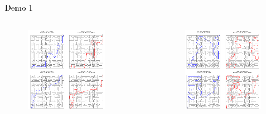 \documentclass[aspectratio=169]{beamer}
\begin{document}
\begin{frame}{Demo 1}
    \begin{columns}[c]
        \begin{figure}
            \centering
            \includegraphics[width=0.8\textwidth]{../imgs/maze-1.png}
            \caption{}
        \end{figure}
        
        \begin{figure}
            \centering
            \includegraphics[width=0.8\textwidth]{../imgs/maze-2.png}
            \caption{}
        \end{figure}
    \end{columns}
\end{frame}
\end{document}
